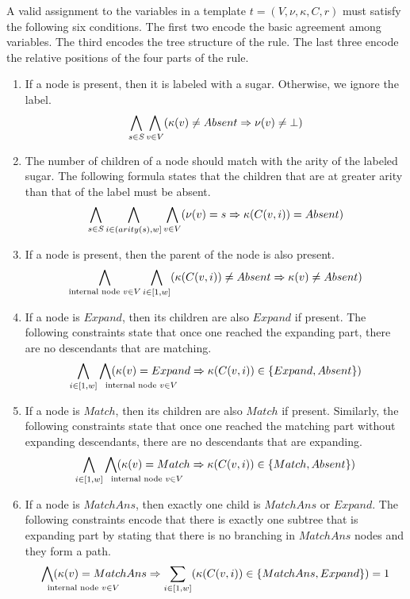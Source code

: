 A valid assignment to the variables in
a template  $t = (V, \nu, \kappa, C, r)$ must
satisfy the following six conditions.
The first two encode the basic agreement among variables.
The third encodes the tree structure of the rule.
The last three encode the relative positions of the four
parts of the rule.
\begin{enumerate}
\item If a node is present, then it is labeled with a sugar. Otherwise, we ignore the label.
$$
\bigwedge_{s \in S} \bigwedge_{v \in V} (\kappa(v) \neq Absent \Rightarrow \nu(v) \neq \bot )
$$
\item  The number of children of a node should match with the arity of the labeled sugar.
  The following formula states that the children that are at greater arity than that of the label
  must be absent.
$$
\bigwedge_{s \in S} \bigwedge_{i \in (arity(s),w] }\bigwedge_{v \in V} (\nu(v) = s \Rightarrow \kappa( C(v,i) ) = Absent )
$$
\item If a node is present, then the parent of the node is also present.
  $$
  \bigwedge_{{\text{internal node } v \in V}}
  \bigwedge_{i\in[1,w]} (\kappa(C(v,i) ) \neq Absent \Rightarrow \kappa( v ) \neq Absent )  
  $$
\item If a node is $Expand$, then its children are also $Expand$ if present. The following constraints state that once one reached the expanding part, there
are no descendants that are matching.
  $$
\Land_{i\in[1,w]} \Land_{\mathrlap{\text{internal node } v \in V}} (\kappa(v) = Expand \limplies \kappa(C(v,i)) \in \{Expand,Absent\}   )
$$
\item If a node is $Match$, then its children are also $Match$ if present.
  Similarly, the following constraints state that once one reached the matching part without expanding descendants, there are no descendants that are expanding.
$$
\Land_{i\in[1,w]} \Land_{\mathrlap{\text{internal node } v \in V}} (\kappa(v) = Match \limplies \kappa(C(v,i)) \in \{Match,Absent\}   )
$$
\item If a node is $MatchAns$, then exactly one child is $MatchAns$ or $Expand$.
  The following constraints encode that there is exactly one subtree that is expanding part
  by stating that there is no branching in $MatchAns$ nodes and they form a path.  
$$
\Land_{\mathrlap{\text{internal node } v \in V}} (\kappa(v) = MatchAns \limplies \sum_{i\in[1,w]}( \kappa(C(v,i)) \in \{MatchAns,Expand\}) = 1
$$
\end{enumerate}

